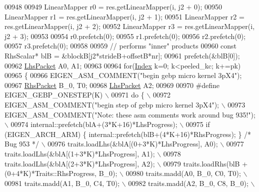 \begin{DoxyCode}
00948 
00949           LinearMapper r0 = res.getLinearMapper(i, j2 + 0);
00950           LinearMapper r1 = res.getLinearMapper(i, j2 + 1);
00951           LinearMapper r2 = res.getLinearMapper(i, j2 + 2);
00952           LinearMapper r3 = res.getLinearMapper(i, j2 + 3);
00953 
00954           r0.prefetch(0);
00955           r1.prefetch(0);
00956           r2.prefetch(0);
00957           r3.prefetch(0);
00958 
00959           \textcolor{comment}{// performs "inner" products}
00960           \textcolor{keyword}{const} RhsScalar* blB = &blockB[j2*strideB+offsetB*nr];
00961           prefetch(&blB[0]);
00962           \hyperlink{class_eigen_1_1internal_1_1_tensor_lazy_evaluator_writable}{LhsPacket} A0, A1;
00963 
00964           \textcolor{keywordflow}{for}(\hyperlink{namespace_eigen_a62e77e0933482dafde8fe197d9a2cfde}{Index} k=0; k<peeled\_kc; k+=pk)
00965           \{
00966             EIGEN\_ASM\_COMMENT(\textcolor{stringliteral}{"begin gebp micro kernel 3pX4"});
00967             \hyperlink{class_eigen_1_1internal_1_1_tensor_lazy_evaluator_writable}{RhsPacket} B\_0, T0;
00968             \hyperlink{class_eigen_1_1internal_1_1_tensor_lazy_evaluator_writable}{LhsPacket} A2;
00969 
00970 \textcolor{preprocessor}{#define EIGEN\_GEBP\_ONESTEP(K) \(\backslash\)}
00971 \textcolor{preprocessor}{            do \{ \(\backslash\)}
00972 \textcolor{preprocessor}{              EIGEN\_ASM\_COMMENT("begin step of gebp micro kernel 3pX4"); \(\backslash\)}
00973 \textcolor{preprocessor}{              EIGEN\_ASM\_COMMENT("Note: these asm comments work around bug 935!"); \(\backslash\)}
00974 \textcolor{preprocessor}{              internal::prefetch(blA+(3*K+16)*LhsProgress); \(\backslash\)}
00975 \textcolor{preprocessor}{              if (EIGEN\_ARCH\_ARM) \{ internal::prefetch(blB+(4*K+16)*RhsProgress); \} }\textcolor{comment}{/* Bug 953 */}\textcolor{preprocessor}{ \(\backslash\)}
00976 \textcolor{preprocessor}{              traits.loadLhs(&blA[(0+3*K)*LhsProgress], A0);  \(\backslash\)}
00977 \textcolor{preprocessor}{              traits.loadLhs(&blA[(1+3*K)*LhsProgress], A1);  \(\backslash\)}
00978 \textcolor{preprocessor}{              traits.loadLhs(&blA[(2+3*K)*LhsProgress], A2);  \(\backslash\)}
00979 \textcolor{preprocessor}{              traits.loadRhs(blB + (0+4*K)*Traits::RhsProgress, B\_0); \(\backslash\)}
00980 \textcolor{preprocessor}{              traits.madd(A0, B\_0, C0, T0); \(\backslash\)}
00981 \textcolor{preprocessor}{              traits.madd(A1, B\_0, C4, T0); \(\backslash\)}
00982 \textcolor{preprocessor}{              traits.madd(A2, B\_0, C8, B\_0); \(\backslash\)}

\end{DoxyCode}

